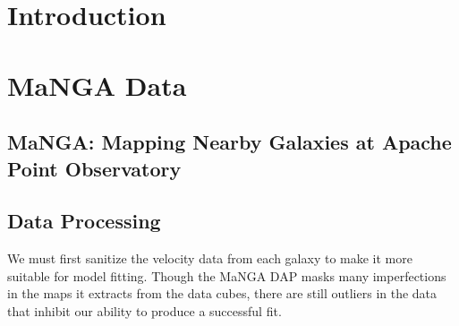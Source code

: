 

\section{Introduction}
\label{sec:intro}

\section{MaNGA Data}
\label{sec:data}

\subsection{MaNGA: Mapping Nearby Galaxies at Apache Point Observatory} \label{sec:manga}


\subsection{Data Processing} \label{sec:clipping}

We must first sanitize the velocity data from each galaxy to make it more suitable for model fitting. Though the MaNGA DAP masks many imperfections in the maps it extracts from the data cubes, there are still outliers in the data that inhibit our ability to produce a successful fit. 

